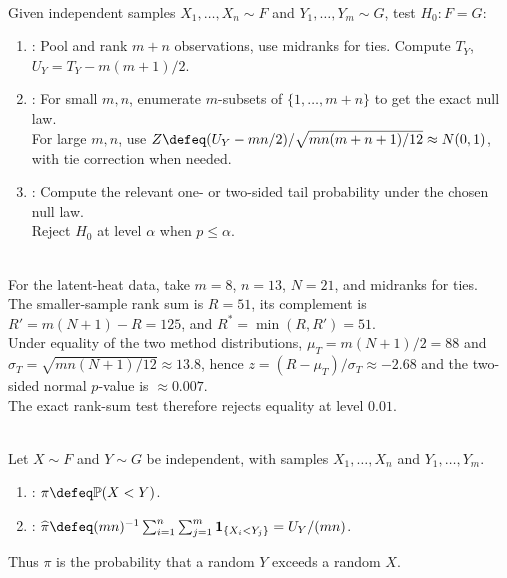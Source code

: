 \begin{method} \label{meth:mann-whitney-test} \\
Given independent samples $X_1,\ldots,X_n\sim F$ and $Y_1,\ldots,Y_m\sim G$, test $H_0:F=G$:
\begin{enumerate}[label=(\roman*)]
\setlength{\itemsep}{0pt}
\item {}: Pool and rank $m+n$ observations, use midranks for ties. Compute $T_Y$, $U_Y=T_Y-m(m+1)/2$.
\item {}: For small $m,n$, enumerate $m$-subsets of $\{1,\ldots,m+n\}$ to get the exact null law.\\
For large $m,n$, use $Z\defeq (U_Y-mn/2)/\sqrt{mn(m+n+1)/12}\approx N(0,1)$, with tie correction when needed.
\item {}: Compute the relevant one- or two-sided tail probability under the chosen null law.\\
Reject $H_0$ at level $\alpha$ when $p\leq\alpha$.
\end{enumerate}
\end{method}

\begin{example} \label{ex:heat-fusion-mann-whitney} \\
For the latent-heat data, take $m=8$, $n=13$, $N=21$, and midranks for ties.\\
The smaller-sample rank sum is $R=51$, its complement is $R'=m(N+1)-R=125$, and $R^\ast=\min(R,R')=51$.\\
Under equality of the two method distributions, $\mu_T=m(N+1)/2=88$ and $\sigma_T=\sqrt{mn(N+1)/12}\approx13.8$, hence $z=(R-\mu_T)/\sigma_T\approx-2.68$ and the two-sided normal $p$-value is $\approx0.007$.\\
The exact rank-sum test therefore rejects equality at level $0.01$.
\end{example}

\begin{definition} \label{def:mann-whitney-effect-probability} \\
Let $X\sim F$ and $Y\sim G$ be independent, with samples $X_1,\ldots,X_n$ and $Y_1,\ldots,Y_m$.
\begin{enumerate}[label=(\roman*)]
\setlength{\itemsep}{0pt}
\item {}: $\pi\defeq\mathbb{P}(X<Y)$.
\item {}: $\widehat{\pi}\defeq (mn)^{-1}\sum_{i=1}^n\sum_{j=1}^m\mathbf{1}_{\{X_i<Y_j\}}=U_Y/(mn)$.
\end{enumerate}
Thus $\pi$ is the probability that a random $Y$ exceeds a random $X$.
\end{definition}

